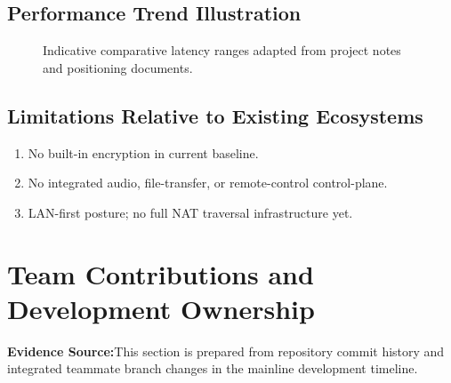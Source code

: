 \documentclass[12pt,a4paper]{article}
\begin{document}
\subsection{Performance Trend Illustration}
\begin{figure}[H]
\centering
{}
\caption{Indicative comparative latency ranges adapted from project notes and positioning documents.}
\label{fig:latencybar}
\end{figure}

\subsection{Limitations Relative to Existing Ecosystems}
\begin{enumerate}[label=\textbf{\arabic*.}, itemsep=6pt]
  \item No built-in encryption in current baseline.
  \item No integrated audio, file-transfer, or remote-control control-plane.
  \item LAN-first posture; no full NAT traversal infrastructure yet.
\end{enumerate}

\newpage

\section{Team Contributions and Development Ownership}

\begin{tcolorbox}[colback=lightgold, colframe=iiitkgold, arc=5pt, boxrule=1pt]
\textbf{Evidence Source:}\enspace This section is prepared from repository commit history and integrated teammate branch changes in the mainline development timeline.
\end{tcolorbox}
\end{document}
